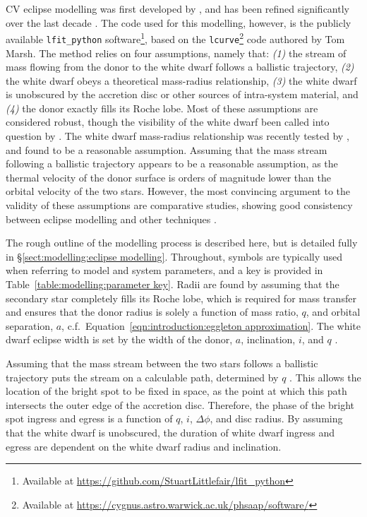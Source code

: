 CV eclipse modelling was first developed by \citet{wood1986}, and has been refined significantly over the last decade \citep{Savoury2011, littlefair2014, mcallister2017, McAllister2019}. The code used for this modelling, however, is the publicly available \lstinline{lfit_python} software\footnote{Available at \href{https://github.com/StuartLittlefair/lfit_python/tree/d36f5449350ef9cad6a285d6fd4cb9bdcd443c13}{https://github.com/StuartLittlefair/lfit\_python}}, based on the \lstinline{lcurve}\footnote{Available at \href{https://cygnus.astro.warwick.ac.uk/phsaap/software/}{https://cygnus.astro.warwick.ac.uk/phsaap/software/}} code authored by Tom Marsh. The method relies on four assumptions, namely that: \textit{(1)} the stream of mass flowing from the donor to the white dwarf follows a ballistic trajectory, \textit{(2)} the white dwarf obeys a theoretical mass-radius relationship, \textit{(3)} the white dwarf is unobscured by the accretion disc or other sources of intra-system material, and \textit{(4)} the donor exactly fills its Roche lobe.
Most of these assumptions are considered robust, though the visibility of the white dwarf been called into question by \citet{Spark2015}.
The white dwarf mass-radius relationship was recently tested by \citet{parsons2017}, and found to be a reasonable assumption.
Assuming that the mass stream following a ballistic trajectory appears to be a reasonable assumption, as the thermal velocity of the donor surface is orders of magnitude lower than the orbital velocity of the two stars.
However, the most convincing argument to the validity of these assumptions are comparative studies, showing good consistency between eclipse modelling and other techniques \citep{tulloch2009,copperwheat2012,savoury2012,sion2022}.

The rough outline of the modelling process is described here, but is detailed fully in \S\ref{sect:modelling:eclipse modelling}. Throughout, symbols are typically used when referring to model and system parameters, and a key is provided in Table~\ref{table:modelling:parameter key}.
Radii are found by assuming that the secondary star completely fills its Roche lobe, which is required for mass transfer and ensures that the donor radius is solely a function of mass ratio, $q$, and orbital separation, $a$, c.f.~Equation~\ref{eqn:introduction:eggleton approximation}.
The white dwarf eclipse width is set by the width of the donor, $a$, inclination, $i$, and $q$ \citep{bailey1979}.

Assuming that the mass stream between the two stars follows a ballistic trajectory puts the stream on a calculable path, determined by $q$ \citep{Lubow1975}. This allows the location of the bright spot to be fixed in space, as the point at which this path intersects the outer edge of the accretion disc. Therefore, the phase of the bright spot ingress and egress is a function of $q$, $i$, $\Delta\phi$, and disc radius.
By assuming that the white dwarf is unobscured, the duration of white dwarf ingress and egress are dependent on the white dwarf radius and inclination.

